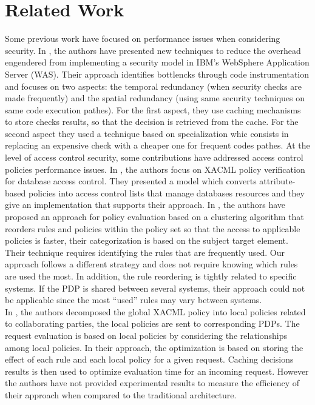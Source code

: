 \section{Related Work} \label{sec:related}

Some previous work have focused on performance issues when considering security.
In \cite{largesystems}, the authors have presented new techniques to reduce the overhead engendered from implementing a security model 
in IBM's WebSphere Application Server (WAS). Their approach identifies bottlencks through code instrumentation and focuses on two aspects: the temporal redundancy (when security checks are made frequently) and the spatial redundancy
(using same security techniques on same code execution pathes). For the first aspect, they use caching mechanisms to store checks results, so that the decision is retrieved from the cache.
For the second aspect they used a technique based on specialization whic consists in replacing an expensive check with a cheaper one for frequent codes pathes.
At the level of access control security, some contributions have addressed access control policies performance issues. In \cite{MyABDAC}, the authors focus on XACML
policy verification for database access control. They presented a model which converts attribute-based policies into access control lists that manage databases resources and they give an implementation 
that supports their approach.
 In \cite{clustering}, the authors have proposed an approach for policy evaluation based on a 
clustering algorithm that reorders rules and policies within the policy set so that the access to applicable policies is faster, their categorization is based on
 the subject target element. Their technique requires identifying the rules that are frequently used. Our approach follows a different strategy and does not require knowing which 
rules are used the most. In addition, the rule reordering is tightly related to specific systems. If the PDP is shared between several
 systems, their approach could not be applicable since the most ``used'' rules may vary between systems. \\
In \cite{decomposition}, 
the authors decomposed the global XACML policy into local policies related to collaborating parties, the local policies 
are sent to corresponding PDPs. The request evaluation is based on local policies by considering the relationships among local
 policies. In their approach, the optimization is based on storing the effect of each rule and each local policy for 
a given request. Caching decisions results is then used to optimize evaluation time for an incoming request. However the authors have 
not provided experimental results to measure the efficiency of their approach when compared to the traditional architecture.  

